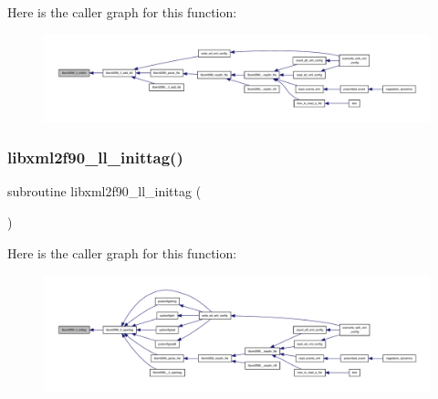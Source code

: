 Here is the caller graph for this function\+:
\nopagebreak
\begin{figure}[H]
\begin{center}
\leavevmode
\includegraphics[width=350pt]{libxml2f90_8f90__pp_8f90_abd1f7aafd23265c8c8ed7934fff5af75_icgraph}
\end{center}
\end{figure}
\mbox{\label{libxml2f90_8f90__pp_8f90_a9ffe2ce74c95d1e444dd17c02cf7ca19}} 
\subsubsection{\texorpdfstring{libxml2f90\+\_\+ll\+\_\+inittag()}{libxml2f90\_ll\_inittag()}}
{\footnotesize\ttfamily subroutine libxml2f90\+\_\+ll\+\_\+inittag (\begin{DoxyParamCaption}{ }\end{DoxyParamCaption})}

Here is the caller graph for this function\+:
\nopagebreak
\begin{figure}[H]
\begin{center}
\leavevmode
\includegraphics[width=350pt]{libxml2f90_8f90__pp_8f90_a9ffe2ce74c95d1e444dd17c02cf7ca19_icgraph}
\end{center}
\end{figure}
\mbox{\label{libxml2f90_8f90__pp_8f90_a102819b1160e7cccf698c60979acaef5}} 
